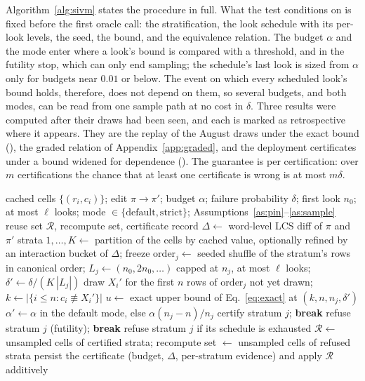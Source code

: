 Algorithm~\ref{alg:sivm} states the procedure in full. What the test
conditions on is fixed before the first oracle call: the
stratification, the look schedule with its per-look levels, the seed,
the bound, and the equivalence relation. The budget $\alpha$ and the
mode enter where a look's bound is compared with a threshold, and in
the futility stop, which can only end sampling; the schedule's last look
is sized from $\alpha$ only for budgets near $0.01$ or below. The event
on which every scheduled look's bound holds, therefore, does not depend on
them, so several budgets, and both modes, can be read from one sample
path at no cost in $\delta$. Three results were computed after their
draws had been seen, and each is marked as retrospective where it
appears. They are the replay of the August draws under the exact bound
(), the graded relation of
Appendix~\ref{app:graded}, and the deployment certificates under a bound
widened for dependence (). The guarantee is per certification: over $m$
certifications the chance that at least one certificate is wrong is at
most $m\delta$.

\begin{algorithm}[t]
\caption{\sivm{} certification of an edit $\pi \to \pi'$}
\label{alg:sivm}
\begin{algorithmic}[1]
\REQUIRE cached cells $\{(r_i, c_i)\}$; edit $\pi \to \pi'$; budget
$\alpha$; failure probability $\delta$; first look $n_0$; at most $\ell$ looks;
mode $\in \{\text{default}, \text{strict}\}$;
Assumptions~\ref{as:pin}--\ref{as:sample}
\ENSURE reuse set $\mathcal{R}$, recompute set, certificate record
\STATE $\Delta \leftarrow$ word-level LCS diff of $\pi$ and $\pi'$
\STATE strata $1, \dots, K \leftarrow$ partition of the cells by cached
value, optionally refined by an interaction bucket of $\Delta$; freeze
  \STATE $\mathrm{order}_j \leftarrow$ seeded shuffle of the stratum's
  rows in canonical order; $L_j \leftarrow (n_0, 2n_0, \dots)$ capped at
  $n_j$, at most $\ell$ looks; $\delta' \leftarrow \delta / (K\,|L_j|)$
    \STATE draw $X_i'$ for the first $n$ rows of $\mathrm{order}_j$ not
    yet drawn; $k \leftarrow |\{ i \le n : c_i \not\equiv X_i' \}|$
    \STATE $u \leftarrow$ exact upper bound of Eq.~\eqref{eq:exact} at
    $(k, n, n_j, \delta')$
    \STATE $\alpha' \leftarrow \alpha$ in the default mode, else
    $\alpha (n_j - n)/n_j$
      \STATE certify stratum $j$; \textbf{break}
    \ENDIF
      \STATE refuse stratum $j$ (futility); \textbf{break}
    \ENDIF
  \ENDFOR
  \STATE refuse stratum $j$ if its schedule is exhausted
\ENDFOR
\STATE $\mathcal{R} \leftarrow$ unsampled cells of certified strata;
recompute set $\leftarrow$ unsampled cells of refused strata
\STATE persist the certificate (budget, $\Delta$, per-stratum evidence)
and apply $\mathcal{R}$ additively
\end{algorithmic}
\end{algorithm}


